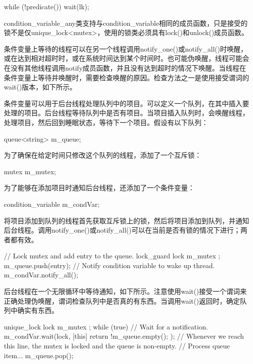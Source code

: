 \begin{cpp}
while (!predicate())
    wait(lk);
\end{cpp}

condition\_variable\_any类支持与condition\_variable相同的成员函数，只是接受的锁不是仅unique\_lock<mutex>，使用的锁类必须具有lock()和unlock()成员函数。


条件变量上等待的线程可以在另一个线程调用notify\_one()或notify\_all()时唤醒，或在达到相对超时时，或在系统时间达到某个时间时。也可能伪唤醒，线程可能会在没有其他线程调用notify成员函数，并且没有达到超时的情况下唤醒。当线程在条件变量上等待并唤醒时，需要检查唤醒的原因。检查方法之一是使用接受谓词的wait()版本，如下所示。


条件变量可以用于后台线程处理队列中的项目。可以定义一个队列，在其中插入要处理的项目。后台线程等待队列中是否有项目。当项目插入队列时，会唤醒线程，处理项目，然后回到睡眠状态，等待下一个项目。假设有以下队列：

\begin{cpp}
queue<string> m_queue;
\end{cpp}

为了确保在给定时间只修改这个队列的线程，添加了一个互斥锁：

\begin{cpp}
mutex m_mutex;
\end{cpp}

为了能够在添加项目时通知后台线程，还添加了一个条件变量：

\begin{cpp}
condition_variable m_condVar;
\end{cpp}

将项目添加到队列的线程首先获取互斥锁上的锁，然后将项目添加到队列，并通知后台线程。调用notify\_one()或notify\_all()可以在当前是否有锁的情况下进行；两者都有效。

\begin{cpp}
// Lock mutex and add entry to the queue.
lock_guard lock { m_mutex };
m_queue.push(entry);
// Notify condition variable to wake up thread.
m_condVar.notify_all();
\end{cpp}

后台线程在一个无限循环中等待通知，如下所示。注意使用wait()接受一个谓词来正确处理伪唤醒，谓词检查队列中是否真的有东西。当调用wait()返回时，确定队列中确实有东西。

\begin{cpp}
unique_lock lock { m_mutex };
while (true) {
    // Wait for a notification.
    m_condVar.wait(lock, [this]{ return !m_queue.empty(); });
    // Whenever we reach this line, the mutex is locked and the queue is non-empty.
    // Process queue item...
    m_queue.pop();
}
\end{cpp}

